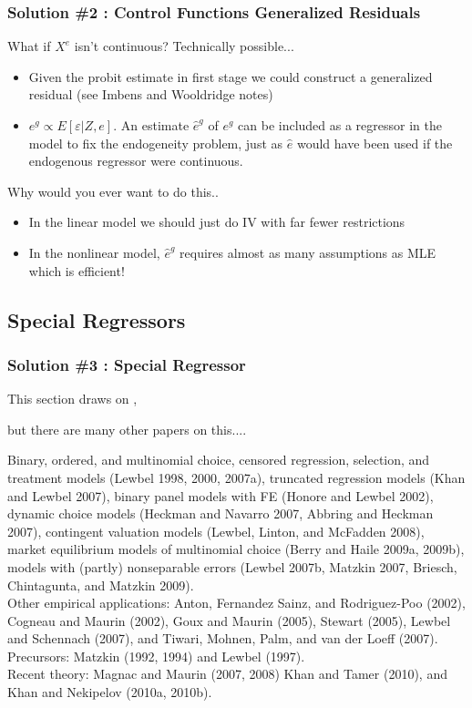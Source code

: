 \begin{frame}
\frametitle{Solution \#2 : Control Functions Generalized Residuals}
What if $X^e$ isn't continuous? Technically possible...
\begin{itemize}
\item Given the probit estimate in first stage we could construct a generalized residual (see Imbens and Wooldridge notes) 
\item $e^g \propto E[\varepsilon | Z, e]$. An estimate $\hat{e}^g$ of $e^g$ can be included as a regressor in the model to fix the endogeneity problem, just as $\hat{e}$ would have been used if the endogenous regressor were continuous.
\end{itemize}
Why would you ever want to do this..
\begin{itemize}
\item In the linear model we should just do IV with far fewer restrictions
\item In the nonlinear model, $\hat{e}^g$ requires almost as many assumptions as MLE which is efficient!
\end{itemize}
\end{frame}

\subsection{Special Regressors}
\begin{frame}
\frametitle{Solution \#3 : Special Regressor}
This section draws on \cite{dong2015simple}, 
\pause

but there are many other papers on this.... 

\small
Binary, ordered, and multinomial choice, censored regression, selection, and treatment models (Lewbel 1998, 2000, 2007a), truncated regression models (Khan and Lewbel 2007), binary panel models with FE (Honore and Lewbel 2002), dynamic choice models (Heckman and Navarro 2007, Abbring and Heckman 2007), contingent valuation models (Lewbel, Linton, and McFadden 2008), market equilibrium models of multinomial choice (Berry and Haile 2009a, 2009b), models with (partly) nonseparable errors (Lewbel 2007b, Matzkin 2007, Briesch, Chintagunta, and Matzkin 2009).\\
Other empirical applications: Anton, Fernandez Sainz, and Rodriguez-Poo (2002), Cogneau and Maurin (2002), Goux and Maurin (2005), Stewart (2005), Lewbel and Schennach (2007), and Tiwari, Mohnen, Palm, and van der Loeff (2007).\\
Precursors: Matzkin (1992, 1994) and Lewbel (1997).\\
Recent theory: Magnac and Maurin (2007, 2008) Khan and Tamer (2010), and Khan and Nekipelov (2010a, 2010b).
\end{frame}


